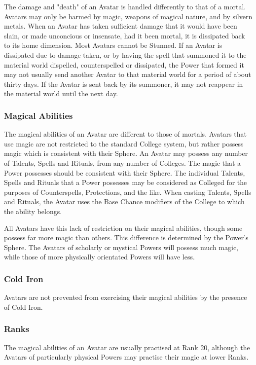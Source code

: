 The damage and "death" of an Avatar is handled differently to that of
a mortal.  Avatars may only be harmed by magic, weapons of magical
nature, and by silvern metals.  When an Avatar has taken sufficient
damage that it would have been slain, or made unconcious or insensate,
had it been mortal, it is dissipated back to its home dimension. Most
Avatars cannot be Stunned. If an Avatar is dissipated due to damage
taken, or by having the spell that summoned it to the material world
dispelled, counterspelled or dissipated, the Power that formed it may
not usually send another Avatar to that material world for a period of
about thirty days.  If the Avatar is sent back by its summoner, it may
not reappear in the material world until the next day.

\subsubsection{Magical Abilities}
The magical abilities of an Avatar are different to those of mortals.
Avatars that use magic are not restricted to the standard College
system, but rather possess magic which is consistent with their
Sphere.  An Avatar may possess any number of Talents, Spells and
Rituals, from any number of Colleges.  The magic that a Power
possesses should be consistent with their Sphere.  The individual
Talents, Spells and Rituals that a Power possesses may be considered
as Colleged for the purposes of Counterspells, Protections, and the
like.  When casting Talents, Spells and Rituals, the Avatar uses the
Base Chance modifiers of the College to which the ability belongs.

All Avatars have this lack of restriction on their magical abilities,
though some possess far more magic than others.  This difference is
determined by the Power's Sphere.  The Avatars of scholarly or
mystical Powers will possess much magic, while those of more
physically orientated Powers will have less.

\subsubsection{Cold Iron}
Avatars are not prevented from exercising their magical abilities by
the presence of Cold Iron.

\subsubsection{Ranks}
The magical abilities of an Avatar are usually practised at Rank 20,
although the Avatars of particularly physical Powers may practise
their magic at lower Ranks.

